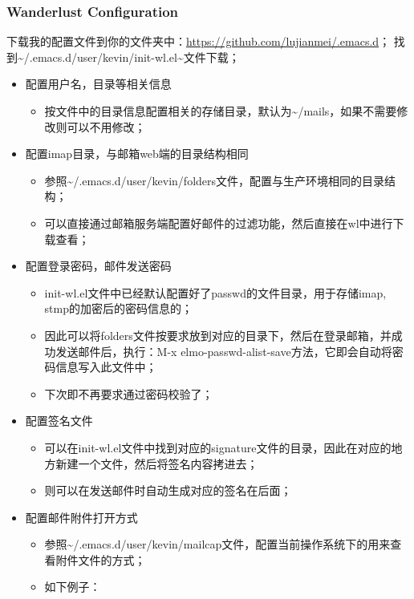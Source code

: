 \documentclass[10pt,a4paper]{article}
\begin{document}
\subsubsection{Wanderlust Configuration}
\label{sec-2-4-2}
下载我的配置文件到你的文件夹中：\url{https://github.com/lujianmei/.emacs.d}；
找到\textasciitilde{}/.emacs.d/user/kevin/init-wl.el\textasciitilde{}文件下载；
\begin{itemize}
\item 配置用户名，目录等相关信息
\begin{itemize}
\item 按文件中的目录信息配置相关的存储目录，默认为\textasciitilde{}/mails，如果不需要修改则可以不用修改；
\end{itemize}
\item 配置imap目录，与邮箱web端的目录结构相同
\begin{itemize}
\item 参照\textasciitilde{}/.emacs.d/user/kevin/folders文件，配置与生产环境相同的目录结构；
\item 可以直接通过邮箱服务端配置好邮件的过滤功能，然后直接在wl中进行下载查看；
\end{itemize}
\item 配置登录密码，邮件发送密码
\begin{itemize}
\item init-wl.el文件中已经默认配置好了passwd的文件目录，用于存储imap, stmp的加密后的密码信息的；
\item 因此可以将folders文件按要求放到对应的目录下，然后在登录邮箱，并成功发送邮件后，执行：M-x elmo-passwd-alist-save方法，它即会自动将密码信息写入此文件中；
\item 下次即不再要求通过密码校验了；
\end{itemize}
\item 配置签名文件
\begin{itemize}
\item 可以在init-wl.el文件中找到对应的signature文件的目录，因此在对应的地方新建一个文件，然后将签名内容拷进去；
\item 则可以在发送邮件时自动生成对应的签名在后面；
\end{itemize}
\item 配置邮件附件打开方式
\begin{itemize}
\item 参照\textasciitilde{}/.emacs.d/user/kevin/mailcap文件，配置当前操作系统下的用来查看附件文件的方式；
\item 如下例子：

\end{itemize}
\end{itemize}
\end{document}

